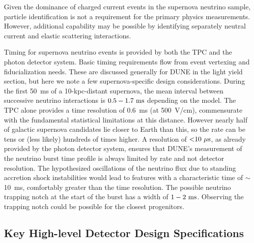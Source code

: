 Given the dominance of \nue{} charged current events in the
supernova neutrino sample, particle identification is not a
requirement for the primary physics measurements.  However,
additional capability may be possible by identifying separately
neutral current and elastic scattering interactions.  


Timing for supernova neutrino events is provided by both the
TPC and the photon detector system.  Basic timing requirements
flow from event vertexing and fiducialization needs.  These are
discussed generally for DUNE in the light yield section, but
here we note a few supernova-specific design considerations.
During the first 50~ms of a 10-kpc-distant supernova, the
mean interval between successive neutrino interactions is
$0.5 - 1.7~\rm{ms}$ depending on the model.  The TPC alone
provides a time resolution of 0.6~ms (at 500~V/cm), commensurate
with the fundamental statistical limitations at this distance.
However nearly half of galactic supernova candidates lie closer
to Earth than this, so the rate can be tens or (less likely)
hundreds of times higher.  A resolution of $\mathord{<}10~\mu\rm{s}$,
as already provided by the photon detector system, ensures that
DUNE's measurement of the neutrino burst time profile is always
limited by rate and not detector resolution.  The hypothesized
oscillations of the neutrino flux due to standing accretion shock
instabilities would lead to features with a characteristic time
of $\sim$10~ms, comfortably greater than the time resolution.
The possible neutrino trapping notch at the start of the burst
has a width of $1 - 2~\rm{ms}$.  Observing the trapping notch
could be possible for the closest progenitors.

\subsection{Key High-level Detector Design Specifications}

